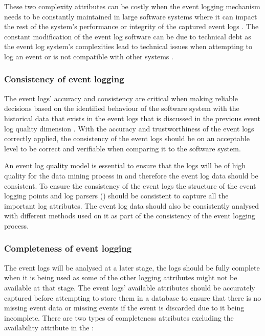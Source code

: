 These two complexity attributes can be costly when the event logging mechanism needs to be constantly maintained in large software systems where it can impact the rest of the system's performance or integrity of the captured event logs \cite{Ogheneovo2014}. The constant modification of the event log software can be due to technical debt as the event log system's complexities lead to technical issues when attempting to log an event or is not compatible with other systems \cite{DeLeon-Sigg2020}.  

\subsubsection{Consistency of event logging} 
The event logs' accuracy and consistency are critical when making reliable decisions based on the identified behaviour of the software system with the historical data that exists in the event logs that is discussed in the previous event log quality dimension \cite{Stojanov2017, Kherbouche2017}. With the accuracy and trustworthiness of the event logs correctly applied, the consistency of the event logs should be on an acceptable level to be correct and verifiable when comparing it to the software system. \par An event log quality model is essential to ensure that the logs will be of high quality for the data mining process in  and therefore the event log data should be consistent. To ensure the consistency of the event logs the structure of the event logging points and log parsers () should be consistent to capture all the important log attributes. The event log data should also be consistently analysed with different methods used on it as part of the consistency of the event logging process.

\subsubsection{Completeness of event logging} 
The event logs will be analysed at a later stage, the logs should be fully complete when it is being used as some of the other logging attributes might not be available at that stage. The event logs' available attributes should be accurately captured before attempting to store them in a database to ensure that there is no missing event data or missing events if the event is discarded due to it being incomplete. There are two types of completeness attributes excluding the availability attribute in the :

